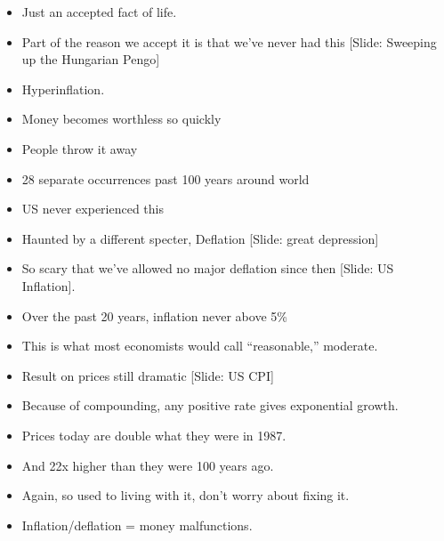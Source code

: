 \documentclass[12pt]{article}
\begin{document}
{\begin{itemize}
\item Just an accepted fact of life.

\item Part of the reason we accept it is that we've never had this [Slide:  Sweeping up the Hungarian Pengo]

\item Hyperinflation.

\item Money becomes worthless so quickly

\item People throw it away

\item 28 separate occurrences past 100 years around world



\item US never experienced this


\item Haunted by a different specter, Deflation [Slide:  great depression]


\item So scary that we've allowed no major deflation since then [Slide:  US Inflation].



\item Over the past 20 years, inflation never above 5\%

\item This is what most economists would call ``reasonable,'' moderate.

\item Result on prices still dramatic [Slide:  US CPI]

\item Because of compounding, any positive rate gives exponential growth.

\item Prices today are double what they were in 1987.

\item And 22x higher than they were 100 years ago.

\item Again, so used to living with it, don't worry about fixing it.

\item Inflation/deflation = money malfunctions.


\end{itemize}}
\end{document}
